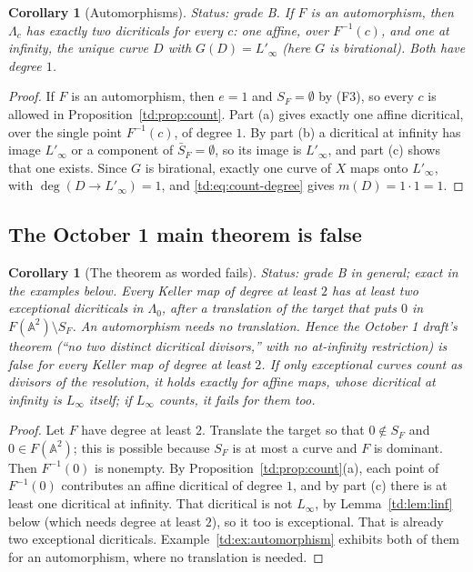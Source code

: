 \documentclass[a4paper,11pt]{article}
\theoremstyle{jsplain}
\newtheorem{corollary}[theorem]{Corollary}
\theoremstyle{jsdef}
\theoremstyle{jsrem}
\begin{document}
\begin{corollary}[Automorphisms]\label{td:cor:automorphisms}
\textit{Status: grade B.}
If $F$ is an automorphism, then $\Lambda_c$ has exactly two dicriticals for every $c$: one
affine, over $F^{-1}(c)$, and one at infinity, the unique curve $D$ with
$G(D) = L'_\infty$ (here $G$ is birational). Both have degree $1$.
\end{corollary}

\begin{proof}
If $F$ is an automorphism, then $e = 1$ and $S_F = \emptyset$ by (F3), so every $c$ is allowed in
Proposition~\ref{td:prop:count}. Part (a) gives exactly one affine dicritical, over the single
point $F^{-1}(c)$, of degree $1$. By part (b) a dicritical at infinity has image $L'_\infty$ or a
component of $\bar S_F = \emptyset$, so its image is $L'_\infty$, and part (c) shows that one
exists. Since $G$ is birational, exactly one curve of $X$ maps onto $L'_\infty$, with
$\deg(D \to L'_\infty) = 1$, and \eqref{td:eq:count-degree} gives $m(D) = 1 \cdot 1 = 1$.
\end{proof}

\subsection{The October 1 main theorem is false}

\begin{corollary}[The theorem as worded fails]\label{td:cor:count-fails}
\textit{Status: grade B in general; exact in the examples below.}
Every Keller map of degree at least $2$ has at least two exceptional dicriticals in
$\Lambda_0$, after a translation of the target that puts $0$ in
$F(\mathbb{A}^2) \setminus S_F$. An automorphism needs no translation. Hence the October 1
draft's theorem (``no two distinct dicritical divisors,'' with no at-infinity restriction) is
false for every Keller map of degree at least $2$. If only exceptional curves count as
divisors of the resolution, it holds exactly for affine maps, whose dicritical at infinity is
$L_\infty$ itself; if $L_\infty$ counts, it fails for them too.
\end{corollary}

\begin{proof}
Let $F$ have degree at least $2$. Translate the target so that $0 \notin S_F$ and
$0 \in F(\mathbb{A}^2)$; this is possible because $S_F$ is at most a curve and $F$ is dominant.
Then $F^{-1}(0)$ is nonempty. By Proposition~\ref{td:prop:count}(a), each point of $F^{-1}(0)$
contributes an affine dicritical of degree $1$, and by part (c) there is at least one dicritical
at infinity. That dicritical is not $L_\infty$, by Lemma~\ref{td:lem:linf} below (which needs
degree at least $2$), so it too is exceptional. That is already two exceptional dicriticals.
Example~\ref{td:ex:automorphism} exhibits both of them for an automorphism, where no
translation is needed.
\end{proof}
\end{document}
